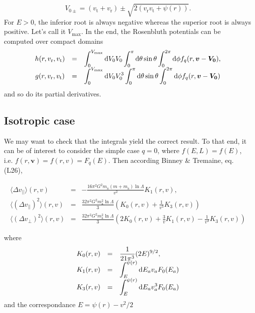 \documentclass[11pt]{article}
\newcommand{\rt}{\mathrm{t}}
\newcommand{\rr}{\mathrm{r}}
\newcommand{\vr}{v_{\rr}}
\newcommand{\vt}{v_{\rt}}
\newcommand{\bv}{\boldsymbol{v}}
\newcommand{\Fq}{F_{q}}
\newcommand{\fq}{f_{q}}
\newcommand{\ra}{\mathrm{a}}
\newcommand{\dvPar}{\Delta v_{||}}
\newcommand{\dvPerp}{\Delta v_{\perp}}
\newcommand{\dvParAvrLoc}{\langle \dvPar \rangle}
\newcommand{\dvParSqAvrLoc}{\langle(\dvPar)^{2}\rangle}
\newcommand{\dvPerpSqAvrLoc}{\langle(\dvPerp)^{2}\rangle}
\newcommand{\ma}{m_{\ra}}
\newcommand{\bV}[1]{\boldsymbol{V_{#1}}}
\newcommand{\rd}{{\rm{d}}}
\newcommand{\Vmax}{V_{\max}}
\begin{document}
\begin{equation}
  V_{0 \pm} = (\vt+\vr)\pm\sqrt{2(\vr\vt+\psi(r))}.
  \label{eq:Vmax}
\end{equation}
For $E>0$, the inferior root is always negative whereas the superior root is always positive. Let's call it $\Vmax$. In the end, the Rosenbluth potentials can be computed over compact domains
\begin{equation}
\begin{array}{ccl}
  h(r,\vr,\vt) &=& \displaystyle{\int_{0}^{\Vmax}{\rd}V_{0} V_{0}\int_{0}^{\pi}{\rd}\theta\sin\theta\int_{0}^{2\pi}{\rd}\phi \fq(r,\bv-\bV0)} ,\\
  g(r,\vr,\vt) &=& \displaystyle{\int_{0}^{\Vmax}{\rd}V_{0} V_{0}^{3}\int_{0}^{\pi}{\rd}\theta\sin\theta\int_{0}^{2\pi}{\rd}\phi \fq(r,\bv-\bV0)}
\end{array}
\label{eq:Rosenbluth_finite}
\end{equation}
and so do its partial derivatives.

\subsection{Isotropic case}
\label{subsec:Isotropic}

We may want to check that the integrals yield the correct result.
To that end, it can be of interest to consider the simple case $q=0$,
where $f(E,L)=f(E)$, i.e. $f(r,\bv)=f(r,v)=\Fq(E)$.
Then according Binney \& Tremaine, eq. (L26),

\begin{equation}
\begin{array}{ccl}
  \dvParAvrLoc(r,v) & =&\displaystyle{-\frac{16\pi^{2}G^{2}\ma(m+\ma)\ln\Lambda}{v^{2}}K_{1}(r,v)} ,\\
  
  \dvParSqAvrLoc(r,v) & = &\displaystyle{\frac{32\pi^{2}G^{2}\ma^{2}\ln\Lambda}{3}\left(K_{0}(r,v)+\frac{1}{v^{3}}K_{3}(r,v)\right)}\\
  
  \dvPerpSqAvrLoc(r,v) & = &\displaystyle{\frac{32\pi^{2}G^{2}\ma^{2}\ln\Lambda}{3}\left(2K_{0}(r,v)+\frac{3}{v}K_{1}(r,v)-\frac{1}{v^{3}}K_{3}(r,v)\right)}   
\end{array}
\label{eq:IsoLocDiffCoefsdRdT}
\end{equation}

where
\begin{equation}
\begin{array}{ccl}
 K_{0}(r,v) & =&\displaystyle{\frac{1}{21\pi^{3}}(2E){}^{9/2}} ,\\
  
  K_{1}(r,v) & = &\displaystyle{\int_{E}^{\psi(r)}{\rm d}E_{a}v_{a}F_{0}(E_{a})}\\
  
  K_{3}(r,v) & = &\displaystyle{\int_{E}^{\psi(r)}{\rm d}E_{a}v_{a}^{3}F_{0}(E_{a})}   
\end{array}
\label{eq:K_Iso}
\end{equation}
and the correspondance $E = \psi(r)-v^{2}/2$
\end{document}
